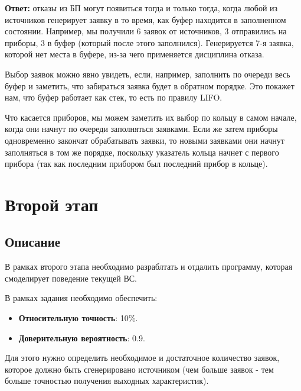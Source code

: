 \documentclass[a4paper, 14pt]{article}
\begin{document}
\begin{enumerate}
	      \textbf{Ответ:} отказы из БП могут появиться тогда и только тогда, когда любой из источников генерирует заявку в то время, как буфер находится в заполненном состоянии. Например, мы получили 6 заявок от источников, 3 отправились на приборы, 3 в буфер (который после этого заполнился). Генерируется 7-я заявка, которой нет места в буфере, из-за чего применяется дисциплина отказа.

	      Выбор заявок можно явно увидеть, если, например, заполнить по очереди весь буфер и заметить, что забираться заявка будет в обратном порядке. Это покажет нам, что буфер работает как стек, то есть по правилу LIFO.

	      Что касается приборов, мы можем заметить их выбор по кольцу в самом начале, когда они начнут по очереди заполняться заявками. Если же затем приборы одновременно закончат обрабатывать заявки, то новыми заявками они начнут заполняться в том же порядке, поскольку указатель кольца начнет с первого прибора (так как последним прибором был последний прибор в кольце).
\end{enumerate}

\section{Второй этап}

\subsection{Описание}

В рамках второго этапа необходимо разраблтать и отдалить программу, которая смоделирует поведение текущей ВС.

В рамках задания необходимо обеспечить:
\begin{itemize}
	\item \textbf{Относительную точность}: 10\%.
	\item \textbf{Доверительную вероятность}: 0.9.
\end{itemize}
Для этого нужно определить необходимое и достаточное количество заявок, которое должно быть сгенерировано источником (чем больше заявок - тем больше точностью получения выходных характеристик).
\end{document}
